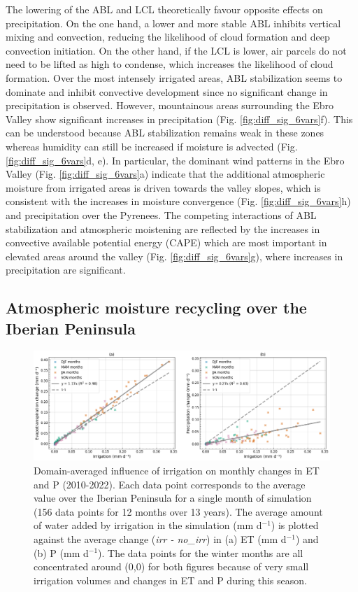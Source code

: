 The lowering of the ABL and LCL theoretically favour opposite effects on precipitation. On the one hand,  a lower and more stable ABL inhibits vertical mixing and convection, reducing the likelihood of cloud formation and deep convection initiation. On the other hand, if the LCL is lower, air parcels do not need to be lifted as high to condense, which increases the likelihood of cloud formation.
Over the most intensely irrigated areas, ABL stabilization seems to dominate and inhibit convective development since no significant change in precipitation is observed.
However, mountainous areas surrounding the Ebro Valley show significant increases in precipitation (Fig. \ref{fig:diff_sig_6vars}f). This can be understood because ABL stabilization remains weak in these zones whereas humidity can still be increased if moisture is advected (Fig. \ref{fig:diff_sig_6vars}d, e). In particular, the dominant wind patterns in the Ebro Valley (Fig. \ref{fig:diff_sig_6vars}a) indicate that the additional atmospheric moisture from irrigated areas is driven towards the valley slopes, which is consistent with the increases in moisture convergence (Fig. \ref{fig:diff_sig_6vars}h) and precipitation over the Pyrenees.
The competing interactions of ABL stabilization and atmospheric moistening are reflected by the increases in convective available potential energy (CAPE) which are most important in elevated areas around the valley (Fig. \ref{fig:diff_sig_6vars}g), where increases in precipitation are significant. 


\subsection{Atmospheric moisture recycling over the Iberian Peninsula}
\label{sec:recycling}
\begin{figure}[htbp]
    \centering
    \includegraphics[width=\textwidth]{images/chap4/article/f08_colorblind.png}
    \caption{Domain-averaged influence of irrigation on monthly changes in ET and P (2010-2022). Each data point corresponds to the average value over the Iberian Peninsula for a single month of simulation (156 data points for 12 months over 13 years). The average amount of water added by irrigation in the \irr simulation (mm d$^{-1}$) is plotted against the average change (\textit{irr - no\_irr}) in (a) ET (mm d$^{-1}$) and (b) P (mm d$^{-1}$). The data points for the winter months are all concentrated around (0,0) for both figures because of very small irrigation volumes and changes in ET and P during this season.}
    \label{fig:scatter_IP}
\end{figure}

